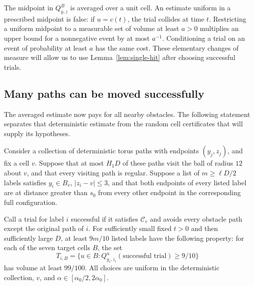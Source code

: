 \begin{remark}\label{bridge:midpoint-quantifier}
The midpoint in $Q_{y,z}^{B}$ is averaged over a unit cell.  An estimate
uniform in a prescribed midpoint is false: if $u=c(t)$, the trial
collides at time $t$.  Restricting a uniform midpoint to a measurable
set of volume at least $a>0$ multiplies an upper bound for a nonnegative
event by at most $a^{-1}$.  Conditioning a trial on an event of
probability at least $a$ has the same cost.  These elementary changes
of measure will allow us to use
Lemma~\ref{lem:single-hit} after choosing successful trials.
\end{remark}

\subsection{Many paths can be moved successfully}

The averaged estimate now pays for all nearby obstacles.  The following
statement separates that deterministic estimate from the random cell
certificates that will supply its hypotheses.

\begin{corollary}\label{cor:success-supply}
Consider a collection of deterministic torus paths with endpoints
$(y_j,z_j)$, and fix a cell $v$.  Suppose that at most $H_1D$ of these
paths visit the ball of radius $12$ about $v$, and that every visiting
path is regular.  Suppose a list of $m\ge\ell D/2$ labels satisfies
$y_i\in B_v$, $|z_i-v|\le3$, and that both endpoints of every listed
label are at distance greater than $s_0$ from every other endpoint in
the corresponding full configuration.

Call a trial for label $i$ successful if it satisfies $\mathcal C_v$
and avoids every obstacle path except the original path of $i$.
For sufficiently small fixed $t>0$ and then sufficiently large $D$,
at least $9m/10$ listed labels have the following property: for each
of the seven target cells $B$, the set
\begin{equation}\label{bridge:successful-target-set}
 T_{i,B}=\{u\in B:
     Q_{y_i,z_i}^u(\text{successful trial})\ge9/10\}
\end{equation}
has volume at least $99/100$.
All choices are uniform in the deterministic collection, $v$, and
$\alpha\in[\alpha_0/2,2\alpha_0]$.
\end{corollary}

